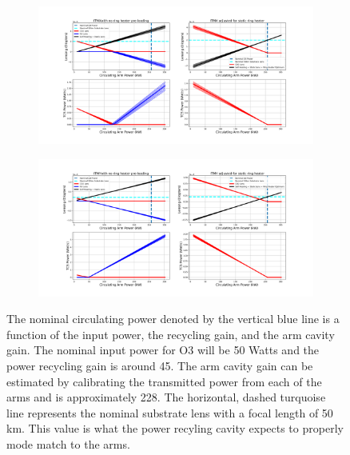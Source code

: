 \begin{figure}[ht]
	\centering
	\begin{subfigure}[b]{1.0\textwidth}
		\centering
		\includegraphics[width=\textwidth]{../Figures/ITMX_TCS_Settings.png}
		\label{fig:TCS_ITMX}
	\end{subfigure}
	\hfill
	\begin{subfigure}[b]{1.0\textwidth}
		\centering
		\includegraphics[width=\textwidth]{../Figures/ITMY_TCS_Settings.png}
		\label{fig:TCS_ITMY}
	\end{subfigure}
	\caption{The nominal circulating power denoted by the vertical blue line is a function of the input power, the recycling gain, and the arm cavity gain.  The nominal input power for O3 will be 50 Watts and the power recycling gain is around 45.  The arm cavity gain can be estimated by calibrating the transmitted power from each of the arms and is approximately 228.  The horizontal, dashed turquoise line represents the nominal substrate lens with a focal length of 50 km.  This value is what the power recyling cavity expects to properly mode match to the arms. }
	\label{fig:TCS_ITMs}
\end{figure}

